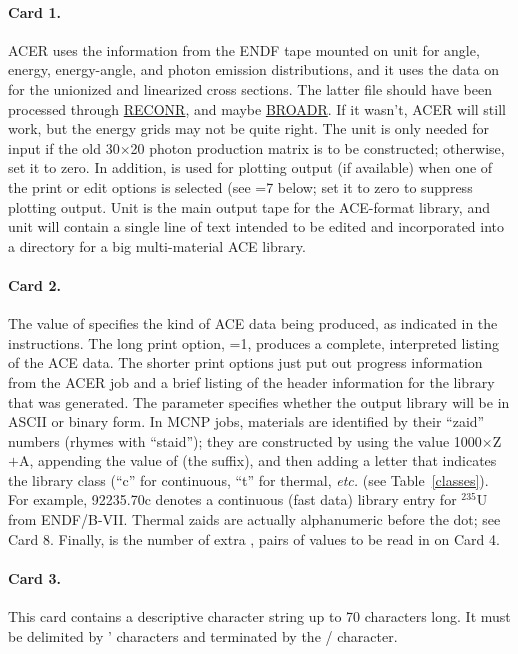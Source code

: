 \paragraph{Card 1.}
ACER uses the information from the ENDF tape mounted on unit
 for angle, energy, energy-angle, and photon emission
distributions, and it uses the data on  for the unionized
and linearized cross sections.  The latter file should have been
processed through \hyperlink{sRECONRhy}{RECONR}, and maybe
\hyperlink{sBROADRhy}{BROADR}.  If it wasn't, ACER will
still work, but the energy grids may not be quite right.  The
 unit is only needed for input if the old 30$\times$20
photon production matrix is to be constructed; otherwise, set it to zero.
In addition,  is used for plotting output (if available)
when one of the print or edit options is selected
(see =7 below; set it to zero to suppress plotting output.
Unit  is the main output tape for the ACE-format library, and
unit  will contain a single line of text intended to be
edited and incorporated into a directory for a big multi-material ACE
library.

\paragraph{Card 2.}
The value of  specifies the kind of ACE data being produced,
as indicated in the instructions.  The long print option, =1,
produces a complete, interpreted listing of the ACE data.  The shorter
print options just put out progress information from the ACER job and
a brief listing of the header information for the library that was
generated.  The  parameter specifies whether the output
library will be in ASCII or binary form.  In MCNP jobs, materials are
identified by their ``zaid'' numbers (rhymes with ``staid''); they are
constructed by using the value 1000$\times$Z$+$A, appending the value
of  (the suffix), and then adding a letter that indicates
the library class (``c'' for continuous, ``t'' for thermal, {\it etc.}
(see Table~\ref{classes}).  For example, 92235.70c denotes a
continuous (fast data) library entry for $^{235}$U from ENDF/B-VII.
Thermal zaids are actually alphanumeric before the dot; see Card 8.
Finally,  is the number of extra , 
pairs of values to be read in on Card 4.

\paragraph{Card 3.}
This card contains a descriptive character string up to 70 characters
long.  It must be delimited by ' characters and terminated by the /
character.

